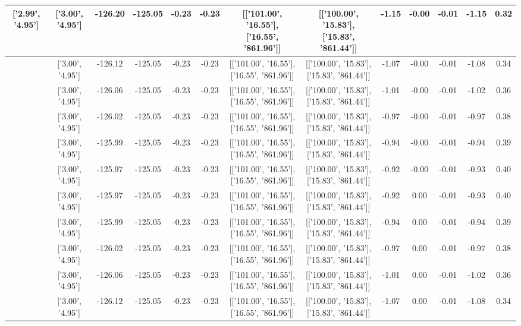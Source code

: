 \begin{table}[htbp]
\begin{adjustbox}{angle=90}
\begin{tabular}{|c|c|c|c|c|c|c|c|c|c|c|c|c|}
 ['2.99', '4.95'] & ['3.00', '4.95'] & -126.20 & -125.05 & -0.23 & -0.23 & [['101.00', '16.55'], ['16.55', '861.96']] & [['100.00', '15.83'], ['15.83', '861.44']] & -1.15 & -0.00 & -0.01 & -1.15 & 0.32\\ \hline
 ['2.99', '4.95'] & ['3.00', '4.95'] & -126.12 & -125.05 & -0.23 & -0.23 & [['101.00', '16.55'], ['16.55', '861.96']] & [['100.00', '15.83'], ['15.83', '861.44']] & -1.07 & -0.00 & -0.01 & -1.08 & 0.34\\ \hline
 ['3.00', '4.95'] & ['3.00', '4.95'] & -126.06 & -125.05 & -0.23 & -0.23 & [['101.00', '16.55'], ['16.55', '861.96']] & [['100.00', '15.83'], ['15.83', '861.44']] & -1.01 & -0.00 & -0.01 & -1.02 & 0.36\\ \hline
 ['3.00', '4.95'] & ['3.00', '4.95'] & -126.02 & -125.05 & -0.23 & -0.23 & [['101.00', '16.55'], ['16.55', '861.96']] & [['100.00', '15.83'], ['15.83', '861.44']] & -0.97 & -0.00 & -0.01 & -0.97 & 0.38\\ \hline
 ['3.00', '4.95'] & ['3.00', '4.95'] & -125.99 & -125.05 & -0.23 & -0.23 & [['101.00', '16.55'], ['16.55', '861.96']] & [['100.00', '15.83'], ['15.83', '861.44']] & -0.94 & -0.00 & -0.01 & -0.94 & 0.39\\ \hline
 ['3.00', '4.95'] & ['3.00', '4.95'] & -125.97 & -125.05 & -0.23 & -0.23 & [['101.00', '16.55'], ['16.55', '861.96']] & [['100.00', '15.83'], ['15.83', '861.44']] & -0.92 & -0.00 & -0.01 & -0.93 & 0.40\\ \hline
 ['3.00', '4.95'] & ['3.00', '4.95'] & -125.97 & -125.05 & -0.23 & -0.23 & [['101.00', '16.55'], ['16.55', '861.96']] & [['100.00', '15.83'], ['15.83', '861.44']] & -0.92 & 0.00 & -0.01 & -0.93 & 0.40\\ \hline
 ['3.00', '4.95'] & ['3.00', '4.95'] & -125.99 & -125.05 & -0.23 & -0.23 & [['101.00', '16.55'], ['16.55', '861.96']] & [['100.00', '15.83'], ['15.83', '861.44']] & -0.94 & 0.00 & -0.01 & -0.94 & 0.39\\ \hline
 ['3.00', '4.95'] & ['3.00', '4.95'] & -126.02 & -125.05 & -0.23 & -0.23 & [['101.00', '16.55'], ['16.55', '861.96']] & [['100.00', '15.83'], ['15.83', '861.44']] & -0.97 & 0.00 & -0.01 & -0.97 & 0.38\\ \hline
 ['3.00', '4.95'] & ['3.00', '4.95'] & -126.06 & -125.05 & -0.23 & -0.23 & [['101.00', '16.55'], ['16.55', '861.96']] & [['100.00', '15.83'], ['15.83', '861.44']] & -1.01 & 0.00 & -0.01 & -1.02 & 0.36\\ \hline
 ['3.01', '4.95'] & ['3.00', '4.95'] & -126.12 & -125.05 & -0.23 & -0.23 & [['101.00', '16.55'], ['16.55', '861.96']] & [['100.00', '15.83'], ['15.83', '861.44']] & -1.07 & 0.00 & -0.01 & -1.08 & 0.34\\ \hline

\end{tabular}
\end{adjustbox}
\end{table}
